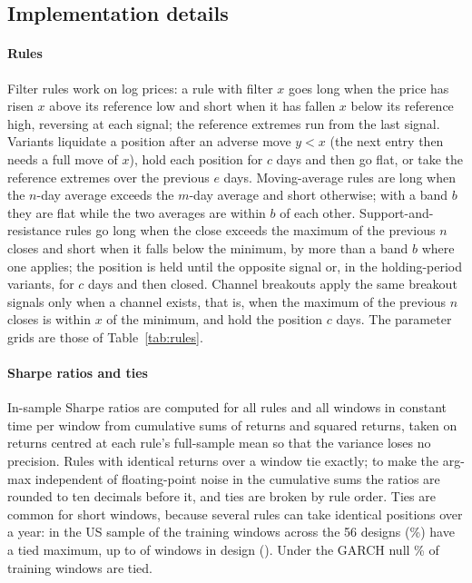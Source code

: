 \documentclass[pdflatex,sn-basic]{sn-jnl}
\theoremstyle{thmstyleone}
\theoremstyle{thmstylethree}
\begin{document}
\begin{appendices}

\section{Implementation details}\label{app:impl}

\paragraph{Rules} Filter rules work on log prices: a rule with filter $x$ goes long when the price has
risen $x$ above its reference low and short when it has fallen $x$ below its reference high, reversing at
each signal; the reference extremes run from the last signal. Variants liquidate a position after an
adverse move $y<x$ (the next entry then needs a full move of $x$), hold each position for $c$ days and
then go flat, or take the reference extremes over the previous $e$ days. Moving-average rules are long
when the $n$-day average exceeds the $m$-day average and short otherwise; with a band $b$ they are flat
while the two averages are within $b$ of each other. Support-and-resistance rules go long when the close
exceeds the maximum of the previous $n$ closes and short when it falls below the minimum, by more than a
band $b$ where one applies; the position is held until the opposite signal or, in the holding-period
variants, for $c$ days and then closed. Channel breakouts apply the same breakout signals only when a
channel exists, that is, when the maximum of the previous $n$ closes is within $x$ of the minimum, and
hold the position $c$ days. The parameter grids are those of Table~\ref{tab:rules}.

\paragraph{Sharpe ratios and ties} In-sample Sharpe ratios are computed for all rules and all windows in
constant time per window from cumulative sums of returns and squared returns, taken on returns centred
at each rule's full-sample mean so that the variance loses no precision. Rules with identical returns
over a window tie exactly; to make the arg-max independent of floating-point noise in the cumulative sums
the ratios are rounded to ten decimals before it, and ties are broken by rule order. Ties are common for
short windows, because several rules can take identical positions over a year: in the US sample
\NumUStiedWindows{} of the \NumUSwindows{} training windows across the 56 designs (\NumUStiedShare\%)
have a tied maximum, up to \NumUSmaxTied{} of \NumUSmaxTiedBlocks{} windows in design
\NumUSmaxTiedDesign{} (\NumUSmaxTiedDesc). Under the GARCH null \NumMCtiedShare\% of training windows
are tied.


\end{appendices}
\end{document}
